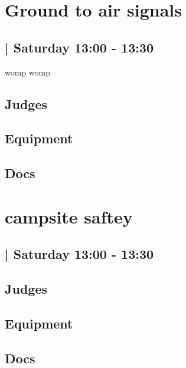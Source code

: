 \documentclass[10pt]{article}
\begin{document}
		\begin{minipage}{\linewidth}
		\setcounter{section}{28}
	\section{Ground to air signals }
	\subsection*{ | Saturday 13:00 - 13:30}

	womp womp

	\begin{multicols}{2}
	\subsection*{\faUsers \: Judges}
	\begin{itemize}
		\end{itemize}
	\columnbreak
	\subsection*{\faWrench \: Equipment}
	        \vfill\null
        \subsection*{\faFile \: Docs}
     	\end{multicols}


	\vspace{1cm}
	\end{minipage}

		\begin{minipage}{\linewidth}
		\setcounter{section}{29}
	\section{campsite saftey }
	\subsection*{ | Saturday 13:00 - 13:30}

	

	\begin{multicols}{2}
	\subsection*{\faUsers \: Judges}
	\begin{itemize}
		\end{itemize}
	\columnbreak
	\subsection*{\faWrench \: Equipment}
	        \vfill\null
        \subsection*{\faFile \: Docs}
     	\end{multicols}


	\vspace{1cm}
	\end{minipage}
\end{document}
